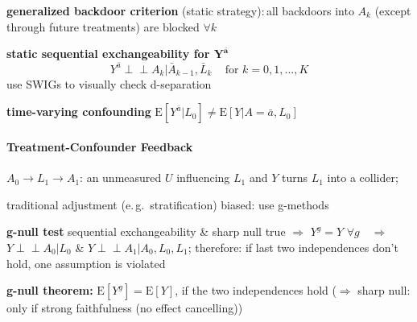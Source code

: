 \documentclass[8pt,oneside]{extarticle}
\newcommand{\indep}{\perp \!\!\! \perp}
\begin{document}
\begin{multicols}{2}
\noindent \textbf{generalized backdoor criterion} (static strategy):\,all backdoors into $A_k$ (except through future treatments) are blocked $\forall k$ 


\noindent \textbf{static sequential exchangeability for $\boldsymbol{Y^{\bar{a}}}$}
$$Y^{\bar{a}} \indep A_k| \bar{A}_{k-1}, \bar{L}_k \,\,\,\,\, \text{ for } k=0,1,...,K$$
use SWIGs to visually check d-separation

\noindent \textbf{time-varying confounding} $\mathrm{E}\left[Y^{\bar{a}}|L_0\right] \neq \mathrm{E}\left[Y|A=\bar{a}, L_0\right]$


\paragraph{\large Treatment-Confounder Feedback} $A_0 \rightarrow L_1 \rightarrow A_1$: an unmeasured $U$ influencing $L_1$ and $Y$ turns $L_1$ into a collider;

\noindent traditional adjustment (e.\,g.\ stratification) biased: use g-methods

\noindent \textbf{g-null test} sequential exchangeability \& sharp null true $\Rightarrow$ $Y^g = Y \,\, \forall g$ $\,\,\,\,\Rightarrow \,\,\,\,$ $Y \indep A_0|L_0$ \& $Y \indep A_1|A_0, L_0, L_1$;
therefore: \newline if last two independences don't hold, one assumption is violated

\noindent \textbf{g-null theorem:} $\mathrm{E}\left[Y^g\right] = \mathrm{E}\left[Y\right]$, if the two independences hold \newline($\Rightarrow$ sharp null: only if strong faithfulness (no effect cancelling))



\end{multicols}




\def\bibpreamble{\textit{If no citation is given, the information is taken from the book \citep{hernan2020causal}} \vspace{1.5em}}

 
 
\end{document}
